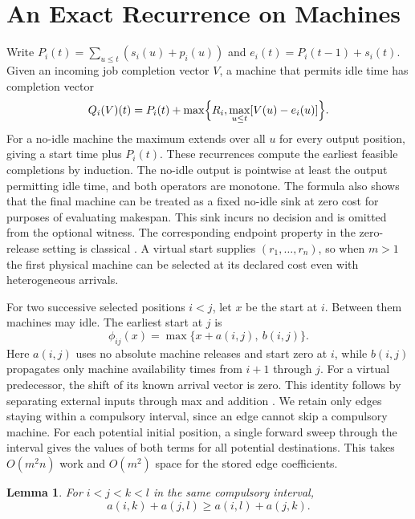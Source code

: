 \documentclass[11pt,letterpaper]{article}
\newtheorem{lemma}{Lemma}
\begin{document}
\section{An Exact Recurrence on Machines}
\label{sec:recurrence}

Write $P_i(t)=\sum_{u\le t}(s_i(u)+p_i(u))$ and $e_i(t)=P_i(t-1)+s_i(t)$. Given an incoming job completion vector $V$, a machine that permits idle time has completion vector
\[
Q_i(V)(t)=P_i(t)+\max\Bigl\{R_i,\max_{u\le t}[V(u)-e_i(u)]\Bigr\}.
\]
For a no-idle machine the maximum extends over all $u$ for every output position, giving a start time plus $P_i(t)$. These recurrences compute the earliest feasible completions by induction. The no-idle output is pointwise at least the output permitting idle time, and both operators are monotone. The formula also shows that the final machine can be treated as a fixed no-idle sink at zero cost for purposes of evaluating makespan. This sink incurs no decision and is omitted from the optional witness. The corresponding endpoint property in the zero-release setting is classical \citep[][Proposition~1]{SaadaniBaptiste}. A virtual start supplies $(r_1,\ldots,r_n)$, so when $m>1$ the first physical machine can be selected at its declared cost even with heterogeneous arrivals.

For two successive selected positions $i<j$, let $x$ be the start at $i$. Between them machines may idle. The earliest start at $j$ is
\[
\phi_{ij}(x)=\max\{x+a(i,j),\ b(i,j)\}.
\]
Here $a(i,j)$ uses no absolute machine releases and start zero at $i$, while $b(i,j)$ propagates only machine availability times from $i+1$ through $j$. For a virtual predecessor, the shift of its known arrival vector is zero. This identity follows by separating external inputs through max and addition \citep[][\S1.2]{Baccelli1992}. We retain only edges staying within a compulsory interval, since an edge cannot skip a compulsory machine. For each potential initial position, a single forward sweep through the interval gives the values of both terms for all potential destinations. This takes $O(m^2n)$ work and $O(m^2)$ space for the stored edge coefficients.

\begin{lemma}
\label{lem:monge}
For $i<j<k<l$ in the same compulsory interval,
\[
a(i,k)+a(j,l)\ge a(i,l)+a(j,k).
\]
\end{lemma}
\end{document}
